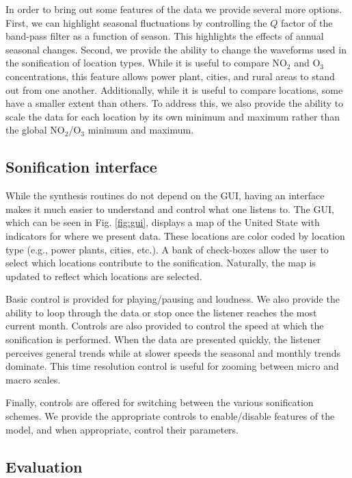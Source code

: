 \documentclass[a4paper,10pt,oneside]{article}
\newcommand{\ce}[1]{$\mathrm{#1}$}
\begin{document}
\begin{sloppy}
In order to bring out some features of the data we provide several more options. First, we can highlight seasonal fluctuations by controlling the $Q$ factor of the band-pass filter as a function of season. This highlights the effects of annual seasonal changes. Second, we provide the ability to change the waveforms used in the sonification of location types. While it is useful to compare \ce{NO_2} and \ce{O_3} concentrations, this feature allows power plant, cities, and rural areas to stand out from one another. Additionally, while it is useful to compare locations, some have a smaller extent than others. To address this, we also provide the ability to scale the data for each location by its own minimum and maximum rather than the global \ce{NO_2}/\ce{O_3} minimum and maximum.  


\subsection{Sonification interface}

While the synthesis routines do not depend on the GUI, having an interface makes it much easier to understand and control what one listens to. The GUI, which can be seen in Fig. \ref{fig:gui}, displays a map of the United State with indicators for where we present data.  These locations are color coded by location type (e.g., power plants, cities, etc.). A bank of check-boxes allow the user to select which locations contribute to the sonification. Naturally, the map is updated to reflect which locations are selected.  


Basic control is provided for playing/pausing and loudness. We also provide the ability to loop through the data or stop once the listener reaches the most current month.  Controls are also provided to control the speed at which the sonification is performed.  When the data are presented quickly, the listener perceives general trends while at slower speeds the seasonal and monthly trends dominate.  This time resolution control is useful for zooming between micro and macro scales.  

Finally, controls are offered for switching between the various sonification schemes. We provide the appropriate controls to enable/disable features of the model, and when appropriate, control their parameters.  

\subsection{Evaluation}


\end{sloppy}
\end{document}
